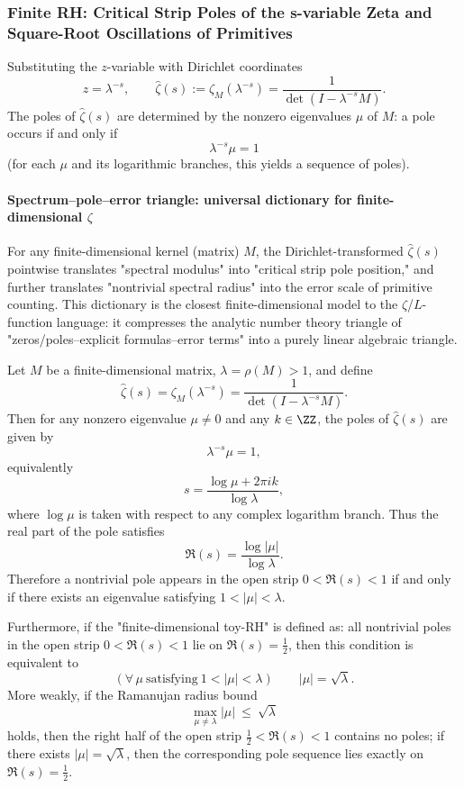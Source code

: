 \subsubsection{Finite RH: Critical Strip Poles of the s-variable Zeta and Square-Root Oscillations of Primitives}\label{app:real-input-40-finite-rh}
Substituting the $z$-variable with Dirichlet coordinates
\[
z=\lambda^{-s},\qquad \widehat{\zeta}(s):=\zeta_M(\lambda^{-s})=\frac{1}{\det(I-\lambda^{-s}M)}.
\]
The poles of $\widehat{\zeta}(s)$ are determined by the nonzero eigenvalues $\mu$ of $M$: a pole occurs if and only if
\[
\lambda^{-s}\mu=1
\]
(for each $\mu$ and its logarithmic branches, this yields a sequence of poles).

\paragraph{Spectrum--pole--error triangle: universal dictionary for finite-dimensional \texorpdfstring{$\zeta$}{zeta}}
For any finite-dimensional kernel (matrix) $M$, the Dirichlet-transformed $\widehat{\zeta}(s)$ pointwise translates "spectral modulus" into "critical strip pole position," and further translates "nontrivial spectral radius" into the error scale of primitive counting.
This dictionary is the closest finite-dimensional model to the \(\zeta\)/\(L\)-function language: it compresses the analytic number theory triangle of "zeros/poles--explicit formulas--error terms" into a purely linear algebraic triangle.

\begin{proposition}\label{prop:finite-rh-triangle-dict}
Let $M$ be a finite-dimensional matrix, $\lambda=\rho(M)>1$, and define
\[
\widehat{\zeta}(s)=\zeta_M(\lambda^{-s})=\frac{1}{\det(I-\lambda^{-s}M)}.
\]
Then for any nonzero eigenvalue $\mu\neq 0$ and any $k\in\ZZ$, the poles of $\widehat{\zeta}(s)$ are given by
\[
\lambda^{-s}\mu=1,
\]
equivalently
\[
s=\frac{\log\mu+2\pi i k}{\log\lambda},
\]
where $\log\mu$ is taken with respect to any complex logarithm branch. Thus the real part of the pole satisfies
\[
\Re(s)=\frac{\log|\mu|}{\log\lambda}.
\]
Therefore a nontrivial pole appears in the open strip $0<\Re(s)<1$ if and only if there exists an eigenvalue satisfying $1<|\mu|<\lambda$.

Furthermore, if the "finite-dimensional toy-RH" is defined as: all nontrivial poles in the open strip $0<\Re(s)<1$ lie on $\Re(s)=\tfrac12$, then this condition is equivalent to
\[
(\forall\,\mu\ \text{satisfying}\ 1<|\mu|<\lambda)\qquad |\mu|=\sqrt{\lambda}.
\]
More weakly, if the Ramanujan radius bound
\[
\max_{\mu\neq\lambda}|\mu|\ \le\ \sqrt{\lambda}
\]
holds, then the right half of the open strip $\tfrac12<\Re(s)<1$ contains no poles; if there exists $|\mu|=\sqrt{\lambda}$, then the corresponding pole sequence lies exactly on $\Re(s)=\tfrac12$.
\end{proposition}

